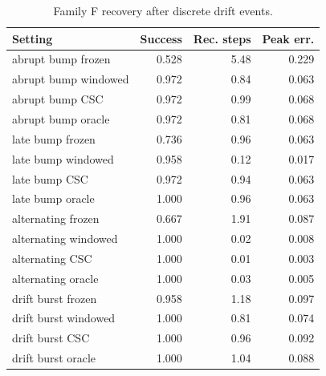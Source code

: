 \begin{table}[t]
\caption{Family F recovery after discrete drift events.}
\label{tab:recovery}
\centering
\begin{tabular}{lrrr}
\toprule
Setting & Success & Rec. steps & Peak err. \\
\midrule
abrupt bump frozen & 0.528 & 5.48 & 0.229 \\
abrupt bump windowed & 0.972 & 0.84 & 0.063 \\
abrupt bump CSC & 0.972 & 0.99 & 0.068 \\
abrupt bump oracle & 0.972 & 0.81 & 0.068 \\
late bump frozen & 0.736 & 0.96 & 0.063 \\
late bump windowed & 0.958 & 0.12 & 0.017 \\
late bump CSC & 0.972 & 0.94 & 0.063 \\
late bump oracle & 1.000 & 0.96 & 0.063 \\
alternating frozen & 0.667 & 1.91 & 0.087 \\
alternating windowed & 1.000 & 0.02 & 0.008 \\
alternating CSC & 1.000 & 0.01 & 0.003 \\
alternating oracle & 1.000 & 0.03 & 0.005 \\
drift burst frozen & 0.958 & 1.18 & 0.097 \\
drift burst windowed & 1.000 & 0.81 & 0.074 \\
drift burst CSC & 1.000 & 0.96 & 0.092 \\
drift burst oracle & 1.000 & 1.04 & 0.088 \\
\bottomrule
\end{tabular}
\end{table}
